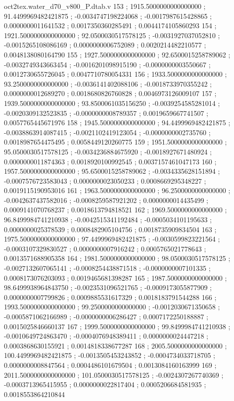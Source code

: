 \begin{filecontents}[overwrite]{oct2tex.water_d70_v800_P.dtab.v}
153 ; 1915.5000000000000000 ; 91.4499969482421875 ; -0.0034747198224068 ; -0.0017987615428865 ; 0.0000000011641532 ; 0.0017350360285491 ; 0.0044174105860293
154 ; 1921.5000000000000000 ; 92.0500030517578125 ; -0.0031927037052810 ; -0.0015265108086169 ; 0.0000000006752089 ; 0.0020214482210577 ; 0.0048138080164790
155 ; 1927.5000000000000000 ; 92.6500015258789062 ; -0.0032749343663454 ; -0.0016201098915190 ; -0.0000000003550667 ; 0.0012730655726045 ; 0.0047710780054331
156 ; 1933.5000000000000000 ; 93.2500000000000000 ; -0.0036141402088106 ; -0.0018733970355242 ; 0.0000000012689270 ; 0.0018680826760828 ; 0.0046973126009107
157 ; 1939.5000000000000000 ; 93.8500061035156250 ; -0.0039254585281014 ; -0.0020309132523835 ; -0.0000000008789357 ; 0.0019659667741507 ; 0.0057765445671976
158 ; 1945.5000000000000000 ; 94.4499969482421875 ; -0.0038863914087415 ; -0.0021102419123054 ; -0.0000000002735760 ; 0.0018987654475495 ; 0.0058449120260775
159 ; 1951.5000000000000000 ; 95.0500030517578125 ; -0.0034236884675920 ; -0.0018927671480924 ; 0.0000000011874363 ; 0.0018920100992545 ; 0.0037157461047173
160 ; 1957.5000000000000000 ; 95.6500015258789062 ; -0.0034335628151894 ; -0.0007576723583043 ; 0.0000000023050233 ; 0.0008669295348227 ; 0.0019115190953016
161 ; 1963.5000000000000000 ; 96.2500000000000000 ; -0.0042637437582016 ; -0.0008259587921202 ; 0.0000000014435499 ; 0.0009141070768237 ; 0.0018613794818521
162 ; 1969.5000000000000000 ; 96.8499984741210938 ; -0.0042515341192484 ; -0.0005034101195633 ; 0.0000000025378539 ; 0.0008482905104756 ; 0.0018735909834504
163 ; 1975.5000000000000000 ; 97.4499969482421875 ; -0.0030599823221564 ; -0.0003107329830527 ; 0.0000000007916242 ; 0.0005765021778643 ; 0.0013571688905358
164 ; 1981.5000000000000000 ; 98.0500030517578125 ; -0.0027132607065141 ; -0.0008254438871518 ; -0.0000000007101335 ; 0.0008173076203093 ; 0.0019465681398287
165 ; 1987.5000000000000000 ; 98.6499938964843750 ; -0.0023531096521765 ; -0.0009173055877909 ; 0.0000000007799826 ; 0.0009885531617329 ; 0.0018183791544288
166 ; 1993.5000000000000000 ; 99.2500000000000000 ; -0.0012030671350658 ; -0.0005871062166989 ; -0.0000000006286427 ; 0.0007172250188887 ; 0.0015025846660137
167 ; 1999.5000000000000000 ; 99.8499984741210938 ; -0.0010649724863470 ; -0.0004076948389411 ; 0.0000000024447218 ; 0.0003868630155921 ; 0.0014818338677287
168 ; 2005.5000000000000000 ; 100.4499969482421875 ; -0.0013505453243852 ; -0.0004734033718705 ; 0.0000000008847564 ; 0.0004486101679504 ; 0.0013084160163999
169 ; 2011.5000000000000000 ; 101.0500030517578125 ; -0.0024307267740369 ; -0.0003713965415955 ; 0.0000000022817404 ; 0.0005206684581935 ; 0.0018553864210844

\end{filecontents}
